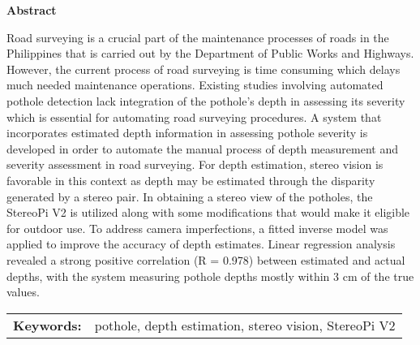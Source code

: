 \begin{center}
\textbf{Abstract}
\end{center}
\setlength{\parindent}{0pt}
Road surveying is a crucial part of the maintenance processes of roads in the Philippines that is carried out by the Department of Public Works and Highways. However, the current process of road surveying is time consuming which delays much needed maintenance operations. Existing studies involving automated pothole detection lack integration of the pothole's depth in assessing its severity which is essential for automating road  surveying procedures.  A system that incorporates estimated depth information in assessing pothole severity is developed in order to automate the manual process of depth measurement and severity assessment in road surveying. For depth estimation, stereo vision is favorable in this context as depth may be estimated through the disparity generated by a stereo pair. In obtaining a stereo view of the potholes, the StereoPi V2 is utilized along with some modifications that would make it eligible for outdoor use.
To address camera imperfections, a fitted inverse model was applied to improve the accuracy of depth estimates. Linear regression analysis revealed a strong positive correlation (R = 0.978) between estimated and actual depths, with the system measuring pothole depths mostly within 3 cm of the true values.


\begin{tabular}{lp{4.25in}}
\hspace{-0.5em}\textbf{Keywords:}\hspace{0.25em} & pothole, depth estimation, stereo vision, StereoPi V2\\
\end{tabular}
